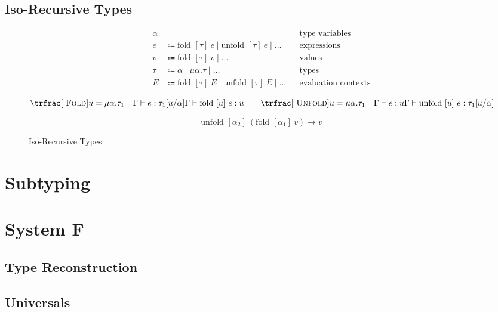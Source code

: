 \documentclass[nonacm]{acmart}
\newcommand{\fold}[2]{\text{fold } [#1]~#2}
\newcommand{\unfold}[2]{\text{unfold } [#1]~#2}
\begin{document}
\subsection{Iso-Recursive Types}

\begin{figure}
  \begin{framed}
    \begin{align*}
      \alpha &                                                           &  & \text{type variables}      \\
      e      & \Coloneqq \fold{\tau}{e} \mid \unfold{\tau}{e} \mid \dots &  & \text{expressions}         \\
      v      & \Coloneqq \fold{\tau}{v} \mid \dots                       &  & \text{values}              \\
      \tau   & \Coloneqq \alpha \mid \mu \alpha . \tau \mid \dots        &  & \text{types}               \\
      E      & \Coloneqq \fold{\tau}{E} \mid \unfold{\tau}{E} \mid \dots &  & \text{evaluation contexts} \\
    \end{align*}
    \[
      \trfrac[~\textsc{Fold}]{u = \mu \alpha . \tau_1 \quad \Gamma \vdash e : \tau_{1}[u/\alpha]}{\Gamma \vdash \fold{u}{e} : u}
      \qquad
      \trfrac[~\textsc{Unfold}]{u = \mu \alpha . \tau_1 \quad \Gamma \vdash e : u}{\Gamma \vdash \unfold{u}{e} : \tau_1[u/\alpha]}
    \]

    \[
      \unfold{\alpha_2}{(\fold{\alpha_1}{v})} \rightarrow v
    \]
  \end{framed}
  \caption{Iso-Recursive Types}\label{fig:recursive-types}
\end{figure}

\section{Subtyping}

\section{System F}

\subsection{Type Reconstruction}

\subsection{Universals}
\end{document}
